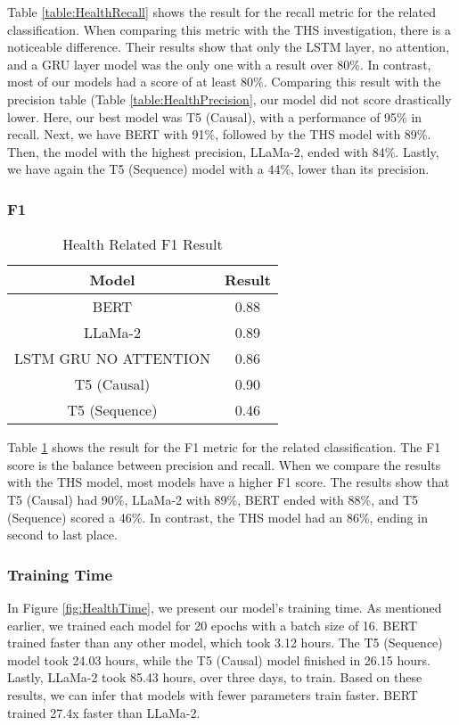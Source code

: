 Table \ref{table:HealthRecall} shows the result for the recall metric for the related classification. When comparing this metric with the THS investigation, there is a noticeable difference. Their results
show that only the LSTM layer, no attention, and a GRU layer model was the only one with a result over 80\%. In contrast, most of our models had a score of at least 80\%. Comparing this result
with the precision table (Table \ref{table:HealthPrecision}, our model did not score drastically lower. Here, our best model was T5 (Causal), with a performance of 95\% in recall. Next, we have
BERT with 91\%, followed by the THS model with 89\%. Then, the model with the highest precision, LLaMa-2, ended with 84\%. Lastly, we have again the T5 (Sequence) model with a 44\%,
lower than its precision.

\subsubsection{F1}
\begin{table}[H]
	\centering
	\caption{Health Related F1 Result}
	\begin{tabular}{||c | c||} 
		\hline
		\textbf{Model} & \textbf{Result} \\ [0.5ex] 
		\hline
		BERT & 0.88  \\
		\hline
		LLaMa-2 & 0.89 \\ 
		\hline
		LSTM GRU NO ATTENTION & 0.86  \\
		\hline
		T5 (Causal) & 0.90 \\
		\hline
		T5 (Sequence) & 0.46 \\
		\hline
	\end{tabular}
	\label{table:HealthF1}
\end{table}

Table \ref{table:HealthF1} shows the result for the F1 metric for the related classification. The F1 score is the balance between precision and recall. When we compare the results with the
THS model, most models have a higher F1 score. The results show that T5 (Causal) had 90\%, LLaMa-2 with 89\%, BERT ended with 88\%, and T5 (Sequence) scored a 46\%. In contrast,
the THS model had an 86\%, ending in second to last place.

\subsubsection{Training Time}

In Figure \ref{fig:HealthTime}, we present our model's training time. As mentioned earlier, we trained each model for 20 epochs with a batch size of 16. BERT trained faster than
any other model, which took 3.12 hours. The T5 (Sequence) model took 24.03 hours, while the T5 (Causal) model finished in 26.15 hours. Lastly, LLaMa-2 took 85.43 hours, over three days, to
train. Based on these results, we can infer that models with fewer parameters train faster. BERT trained 27.4x faster than LLaMa-2.

